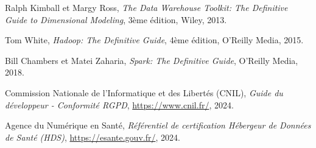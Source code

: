 \documentclass[12pt,a4paper]{article}
\begin{document}
\newpage
\begin{thebibliography}{9}

Ralph Kimball et Margy Ross, 
\textit{The Data Warehouse Toolkit: The Definitive Guide to Dimensional Modeling}, 
3ème édition, Wiley, 2013.

Tom White, 
\textit{Hadoop: The Definitive Guide}, 
4ème édition, O'Reilly Media, 2015.

Bill Chambers et Matei Zaharia, 
\textit{Spark: The Definitive Guide}, 
O'Reilly Media, 2018.

Commission Nationale de l'Informatique et des Libertés (CNIL),
\textit{Guide du développeur - Conformité RGPD},
\url{https://www.cnil.fr/}, 2024.

Agence du Numérique en Santé,
\textit{Référentiel de certification Hébergeur de Données de Santé (HDS)},
\url{https://esante.gouv.fr/}, 2024.

\end{thebibliography}
\end{document}
